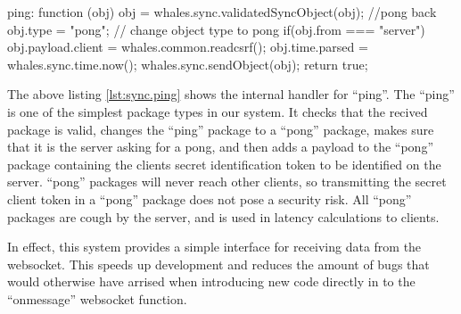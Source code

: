\begin{snippet}[caption=An internal package handler,label=lst:sync.ping]
ping: function (obj) {
    obj = whales.sync.validatedSyncObject(obj);
    //pong back
    obj.type = "pong"; // change object type to pong
    if(obj.from === "server") {
        obj.payload.client = whales.common.readcsrf();
    }
    obj.time.parsed = whales.sync.time.now();
    whales.sync.sendObject(obj);
    return true;
}
\end{snippet}

The above listing \ref{lst:sync.ping} shows the internal handler for ``ping''.
The ``ping'' is one of the simplest package types in our system. It checks that
the recived package is valid, changes the ``ping'' package to a ``pong''
package, makes sure that it is the server asking for a pong, and then
adds a payload to the ``pong'' package containing the clients secret
identification token to be identified on the server. ``pong'' packages will
never reach other clients, so transmitting the secret client token in a ``pong''
package does not pose a security risk. All ``pong'' packages are cough by the
server, and is used in latency calculations to clients.


In effect, this system provides a simple interface for receiving data from the
websocket. This speeds up development and reduces the amount of bugs that would
otherwise have arrised when introducing new code directly in to the
``onmessage'' websocket function.


